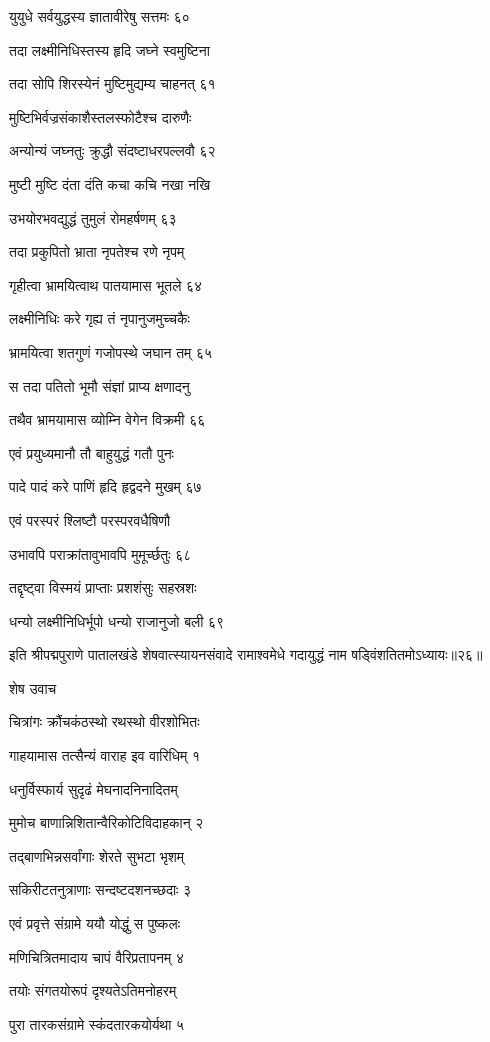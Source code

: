 युयुधे सर्वयुद्धस्य ज्ञातावीरेषु सत्तमः ६०

तदा लक्ष्मीनिधिस्तस्य हृदि जघ्ने स्वमुष्टिना

तदा सोपि शिरस्येनं मुष्टिमुद्यम्य चाहनत् ६१

मुष्टिभिर्वज्रसंकाशैस्तलस्फोटैश्च दारुणैः

अन्योन्यं जघ्नतुः क्रुद्धौ संदष्टाधरपल्लवौ ६२

मुष्टी मुष्टि दंता दंति कचा कचि नखा नखि

उभयोरभवद्युद्धं तुमुलं रोमहर्षणम् ६३

तदा प्रकुपितो भ्राता नृपतेश्च रणे नृपम्

गृहीत्वा भ्रामयित्वाथ पातयामास भूतले ६४

लक्ष्मीनिधिः करे गृह्य तं नृपानुजमुच्चकैः

भ्रामयित्वा शतगुणं गजोपस्थे जघान तम् ६५

स तदा पतितो भूमौ संज्ञां प्राप्य क्षणादनु

तथैव भ्रामयामास व्योम्नि वेगेन विक्रमी ६६

एवं प्रयुध्यमानौ तौ बाहुयुद्धं गतौ पुनः

पादे पादं करे पाणिं हृदि हृद्वदने मुखम् ६७

एवं परस्परं श्लिष्टौ परस्परवधैषिणौ

उभावपि पराक्रांतावुभावपि मुमूर्च्छतुः ६८

तद्दृष्ट्वा विस्मयं प्राप्ताः प्रशशंसुः सहस्रशः

धन्यो लक्ष्मीनिधिर्भूपो धन्यो राजानुजो बली ६९

इति श्रीपद्मपुराणे पातालखंडे शेषवात्स्यायनसंवादे रामाश्वमेधे गदायुद्धं नाम षड्विंशतितमोऽध्यायः॥२६॥


शेष उवाच

चित्रांगः क्रौंचकंठस्थो रथस्थो वीरशोभितः

गाहयामास तत्सैन्यं वाराह इव वारिधिम् १

धनुर्विस्फार्य सुदृढं मेघनादनिनादितम्

मुमोच बाणान्निशितान्वैरिकोटिविदाहकान् २

तद्बाणभिन्नसर्वांगाः शेरते सुभटा भृशम्

सकिरीटतनुत्राणाः सन्दष्टदशनच्छदाः ३

एवं प्रवृत्ते संग्रामे ययौ योद्धुं स पुष्कलः

मणिचित्रितमादाय चापं वैरिप्रतापनम् ४

तयोः संगतयोरूपं दृश्यतेऽतिमनोहरम्

पुरा तारकसंग्रामे स्कंदतारकयोर्यथा ५

